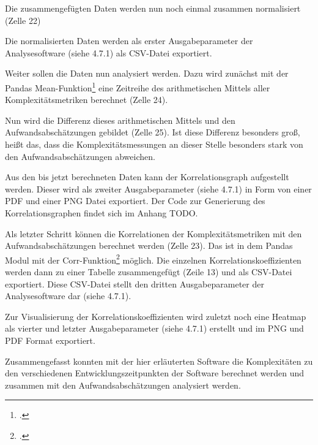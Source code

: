 \lstset{style=pythonStyle}


Die zusammengefügten Daten werden nun noch einmal zusammen normalisiert
(Zelle 22)

\lstset{style=pythonStyle}


Die normalisierten Daten werden als erster Ausgabeparameter der
Analysesoftware (siehe 4.7.1) als CSV-Datei exportiert.

Weiter sollen die Daten nun analysiert werden. Dazu wird zunächst mit
der Pandas Mean-Funktion\footcite[Vgl. ][]{PandasDataFrameMean} eine Zeitreihe
des arithmetischen Mittels aller Komplexitätsmetriken berechnet (Zelle
24).

\lstset{style=pythonStyle}


Nun wird die Differenz dieses arithmetischen Mittels und den
Aufwandsabschätzungen gebildet (Zelle 25). Ist diese Differenz besonders
groß, heißt das, dass die Komplexitätsmessungen an dieser Stelle
besonders stark von den Aufwandsabschätzungen abweichen.

\lstset{style=pythonStyle}


Aus den bis jetzt berechneten Daten kann der Korrelationsgraph
aufgestellt werden. Dieser wird als zweiter Ausgabeparameter (siehe 4.7.1) in Form von einer
PDF und einer PNG Datei exportiert. Der Code zur Generierung des Korrelationsgraphen findet sich im Anhang TODO.

Als letzter Schritt können die Korrelationen der Komplexitätsmetriken
mit den Aufwandsabschätzungen berechnet werden (Zelle 23). Das ist in
dem Pandas Modul mit der Corr-Funktion\footcite[Vgl. ][]{PandasDataFrameCorr}
möglich. Die einzelnen Korrelationskoeffizienten werden dann zu einer
Tabelle zusammengefügt (Zeile 13) und als CSV-Datei exportiert. Diese
CSV-Datei stellt den dritten Ausgabeparameter der Analysesoftware dar
(siehe 4.7.1).

Zur Visualisierung der Korrelationskoeffizienten wird zuletzt noch eine
Heatmap als vierter und letzter Ausgabeparameter (siehe 4.7.1) erstellt
und im PNG und PDF Format exportiert.

Zusammengefasst konnten mit der hier erläuterten Software die
Komplexitäten zu den verschiedenen Entwicklungszeitpunkten der Software
berechnet werden und zusammen mit den Aufwandsabschätzungen analysiert
werden.

